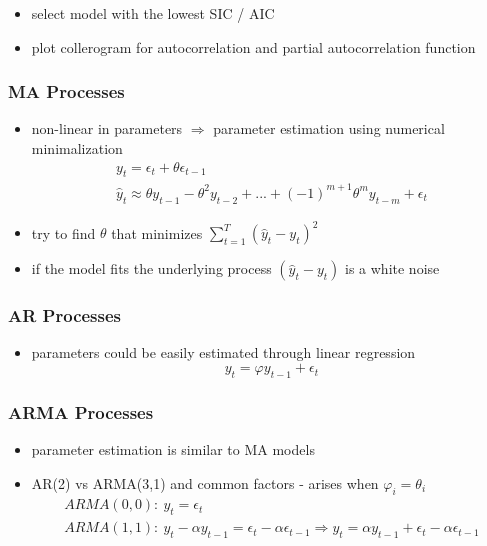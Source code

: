 \begin{itemize}
\item select model with the lowest SIC / AIC
\item plot collerogram for autocorrelation and partial autocorrelation function
\end{itemize}

\subsubsection{MA Processes}

\begin{itemize}
\item non-linear in parameters $\Rightarrow$ parameter estimation using numerical minimalization
\begin{gather*}
y_t = \epsilon_t + \theta \epsilon_{t - 1}\\
\hat{y}_t \approx \theta y_{t-1} - \theta^2 y_{t - 2} + ... + (-1)^{m + 1} \theta ^ m y_{t - m} + \epsilon_t
\end{gather*}
\item try to find $\theta$ that minimizes $\sum_{t = 1}^T (\hat{y}_t - y_t)^2$
\item if the model fits the underlying process $(\hat{y}_t - y_t)$ is a white noise
\end{itemize}

\subsubsection{AR Processes}

\begin{itemize}
\item parameters could be easily estimated through linear regression
\begin{equation*}
y_t = \varphi y_{t - 1} + \epsilon_t
\end{equation*}
\end{itemize}

\subsubsection{ARMA Processes}

\begin{itemize}
\item parameter estimation is similar to MA models
\item AR(2) vs ARMA(3,1) and common factors - arises when $\varphi_i = \theta_i$
\begin{gather*}
ARMA(0, 0): ~ y_t = \epsilon_t\\
ARMA(1, 1): ~ y_t - \alpha y_{t - 1} = \epsilon_t - \alpha \epsilon_{t - 1} \Rightarrow y_t = \alpha y_{t - 1} + \epsilon_t - \alpha \epsilon_{t - 1}
\end{gather*}
\end{itemize}
